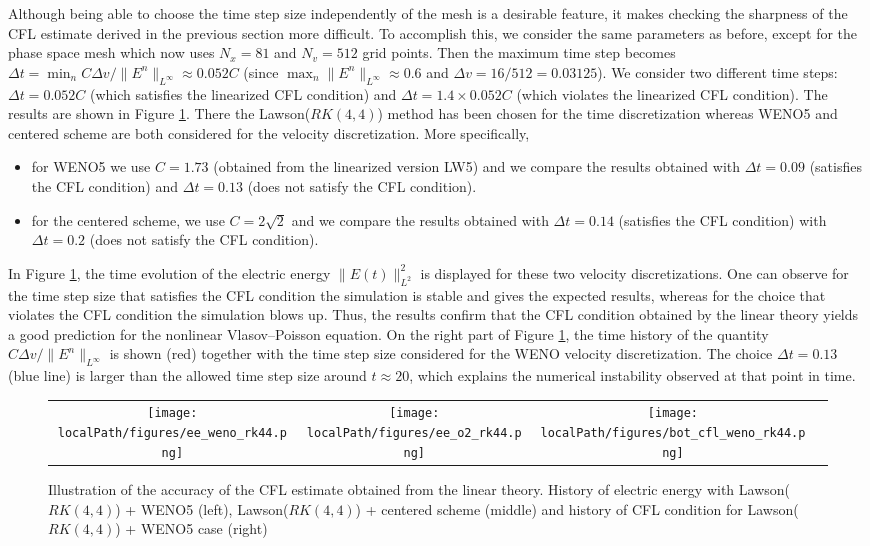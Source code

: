 Although being able to choose the time step size independently of the mesh is a desirable feature, it makes checking the sharpness of the CFL estimate derived in the previous section more difficult. To accomplish this, we consider the same parameters as before, except for the phase space mesh which now uses $N_x=81$ and $N_v=512$ grid points.  Then the maximum time step becomes $\Delta t=\min_n C\Delta v/\|E^n\|_{L^\infty} \approx 0.052C$ (since $\max_n \|E^n\|_{L^\infty}\approx 0.6$ and $\Delta v=16/512=0.03125$). We consider two different time steps:  $\Delta t=0.052C$ (which satisfies the linearized CFL condition) and $\Delta t = 1.4 \times 0.052C$ (which violates the linearized CFL condition). The results are shown in Figure \ref{unstable}. There the Lawson($RK(4,4)$) method has been chosen for the time discretization whereas WENO5 and centered scheme are both considered for the velocity discretization. More specifically,
\begin{itemize}
    \item for WENO5 we use $C=1.73$ (obtained from the linearized version LW5) and we compare the results obtained 
    with $\Delta t=0.09$ (satisfies the CFL condition) and $\Delta t=0.13$ (does not satisfy the CFL condition). 
    \item for the centered scheme, we use $C=2\sqrt{2}$ and we compare the results obtained with $\Delta t=0.14$ (satisfies the CFL condition) with $\Delta t=0.2$ (does not satisfy the CFL condition). 
\end{itemize}
In Figure \ref{unstable}, the time evolution of the electric energy $\|E(t)\|^2_{L^2}$ is displayed for these two velocity discretizations.  
One can observe for the time step size that satisfies the CFL condition the simulation is stable and gives the expected results, whereas for the choice that violates the CFL condition the simulation blows up. Thus, the results confirm that the CFL condition obtained by the linear theory yields a good prediction for the nonlinear Vlasov--Poisson equation. 
On the right part of Figure \ref{unstable}, the time history of the quantity $C \Delta v/ \|E^n\|_{L^\infty}$ is shown (red) together with the time step size considered for the WENO velocity discretization. The choice $\Delta t=0.13$ (blue line) is larger than the allowed time step size around $t\approx 20$, which explains the numerical instability observed at that point in time. 

\begin{figure}
\centering
\begin{tabular}{cccc}
  \texttt{[image: \\localPath/figures/ee\_weno\_rk44.png]} &\hspace{-0.2cm}\texttt{[image: \\localPath/figures/ee\_o2\_rk44.png]} & \hspace{-0.2cm}\texttt{[image: \\localPath/figures/bot\_cfl\_weno\_rk44.png]} 
   \end{tabular}
\caption{Illustration of the accuracy of the CFL estimate obtained from the linear theory. History of electric energy with Lawson($RK(4,4)$) + WENO5 (left),  Lawson($RK(4,4)$) + centered scheme (middle) and history of CFL condition for Lawson($RK(4,4)$) + WENO5 case (right)}
\label{unstable}      
\end{figure}
 
